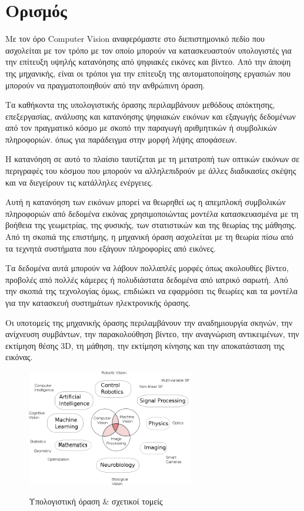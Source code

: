 \section{Ορισμός}

Με τον όρο Computer Vision αναφερόμαστε στο διεπιστημονικό πεδίο που ασχολείται με τον τρόπο με τον οποίο μπορούν να κατασκευαστούν υπολογιστές για την επίτευξη υψηλής κατανόησης από ψηφιακές εικόνες και βίντεο. Από την άποψη της μηχανικής, είναι οι τρόποι για την επίτευξη της αυτοματοποίησης εργασιών που μπορούν να πραγματοποιηθούν από την ανθρώπινη όραση. \cite{wiki:Computer_vision}

Τα καθήκοντα της υπολογιστικής όρασης περιλαμβάνουν μεθόδους απόκτησης, επεξεργασίας, ανάλυσης και κατανόησης ψηφιακών εικόνων και εξαγωγής δεδομένων από τον πραγματικό κόσμο με σκοπό την παραγωγή αριθμητικών ή συμβολικών πληροφοριών. όπως για παράδειγμα στην μορφή λήψης αποφάσεων.

Η κατανόηση σε αυτό το πλαίσιο ταυτίζεται με τη μετατροπή των οπτικών εικόνων σε περιγραφές του κόσμου που μπορούν να αλληλεπιδρούν με άλλες διαδικασίες σκέψης και να διεγείρουν τις κατάλληλες ενέργειες.

Αυτή η κατανόηση των εικόνων μπορεί να θεωρηθεί ως η απεμπλοκή συμβολικών πληροφοριών από δεδομένα εικόνας χρησιμοποιώντας μοντέλα κατασκευασμένα με τη βοήθεια της γεωμετρίας, της φυσικής, των στατιστικών και της θεωρίας της μάθησης. Από τη σκοπιά της επιστήμης, η μηχανική όραση ασχολείται με τη θεωρία πίσω από τα τεχνητά συστήματα που εξάγουν πληροφορίες από εικόνες.

Τα δεδομένα αυτά μπορούν να λάβουν πολλαπλές μορφές όπως ακολουθίες βίντεο, προβολές από πολλές κάμερες ή πολυδιάστατα δεδομένα από ιατρικό σαρωτή. Από την σκοπιά της τεχνολογίας όμως, επιδιώκει να εφαρμόσει τις θεωρίες και τα μοντέλα για την κατασκευή συστημάτων ηλεκτρονικής όρασης.

Οι υποτομείς της μηχανικής όρασης περιλαμβάνουν την αναδημιουργία σκηνών, την ανίχνευση συμβάντων, την παρακολούθηση βίντεο, την αναγνώριση αντικειμένων, την εκτίμηση θέσης 3D, τη μάθηση, την εκτίμηση κίνησης και την αποκατάσταση της εικόνας.
\begin{figure}[H]
  	\centering
	\includegraphics[width=0.65\textwidth]{images/CV}\\
	\caption{Υπολογιστική όραση \& σχετικοί τομείς \cite{wiki:Glossary_of_machine_vision}}
\end{figure}
